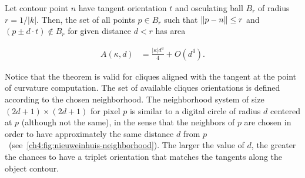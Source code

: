\begin{theorem}{\cite{nieuwenhuis14efficient}}\label{ch4:thm:nieuweinhuis}
Let contour point $n$ have tangent orientation $t$ and osculating ball $B_r$ of radius $r=1/|k|$. Then, the set of all points $p \in B_r$ such that $\lVert p-n\rVert \leq r$ and $(p \pm d \cdot t) \notin B_r$ for given distance $d < r$ has area 

\begin{align*}
	A(\kappa,d) &= \frac{|\kappa|d^3}{4} + O(d^4).
\end{align*}

\end{theorem}

Notice that the theorem is valid for cliques aligned with the tangent at the point of curvature computation. The set of available cliques orientations is defined according to the chosen neighborhood. The neighborhood system of size $(2d+1) \times (2d+1)$ for pixel $p$ is similar to a digital circle of radius $d$ centered at $p$ (although not the same), in the sense that the neighbors of $p$ are chosen in order to have approximately the same distance $d$ from $p$~(see~\cref{ch4:fig:nieuweinhuis-neighborhood}). The larger the value of $d$, the greater the chances to have a triplet orientation that matches the tangents along the object contour.

